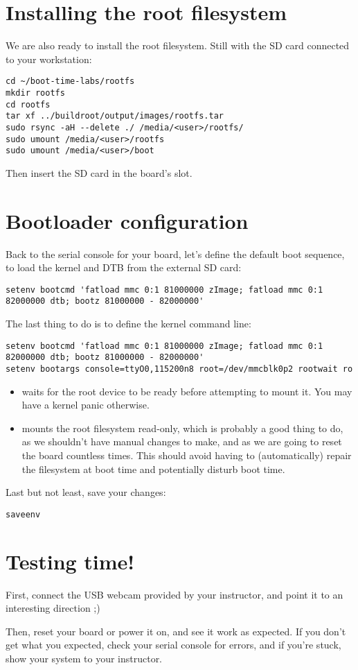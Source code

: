 \section{Installing the root filesystem}

We are also ready to install the root filesystem. Still with the SD card
connected to your workstation:

\begin{verbatim}
cd ~/boot-time-labs/rootfs
mkdir rootfs
cd rootfs
tar xf ../buildroot/output/images/rootfs.tar
sudo rsync -aH --delete ./ /media/<user>/rootfs/
sudo umount /media/<user>/rootfs
sudo umount /media/<user>/boot
\end{verbatim}

Then insert the SD card in the board's slot.

\section{Bootloader configuration}

Back to the serial console for your board, let's define the default boot
sequence, to load the kernel and DTB from the external SD card:

\begin{verbatim}
setenv bootcmd 'fatload mmc 0:1 81000000 zImage; fatload mmc 0:1 82000000 dtb; bootz 81000000 - 82000000'
\end{verbatim}

The last thing to do is to define the kernel command line:
\begin{verbatim}
setenv bootcmd 'fatload mmc 0:1 81000000 zImage; fatload mmc 0:1 82000000 dtb; bootz 81000000 - 82000000'
setenv bootargs console=ttyO0,115200n8 root=/dev/mmcblk0p2 rootwait ro
\end{verbatim}

\begin{itemize}
\item {} waits for the root device to be ready before
attempting to mount it. You may have a kernel panic otherwise.
\item {} mounts the root filesystem read-only, which is probably
a good thing to do, as we shouldn't have manual changes to make, and as
we are going to reset the board countless times. This should avoid
having to (automatically) repair the filesystem at boot time and
potentially disturb boot time.
\end{itemize}

Last but not least, save your changes:
\begin{verbatim}
saveenv
\end{verbatim}

\section{Testing time!}

First, connect the USB webcam provided by your instructor, and point it
to an interesting direction ;)

Then, reset your board or power it on, and see it work as expected. If
you don't get what you expected, check your serial console for errors,
and if you're stuck, show your system to your instructor.
